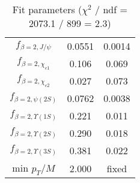 \begin{table}[h!]
\begin{tabular}{c|c|c}
$f_{\beta=2,J/\psi}$ & 0.0551 & 0.0014 \\
$f_{\beta=2,\chi_{c1}}$ & 0.106 & 0.069 \\
$f_{\beta=2,\chi_{c2}}$ & 0.027 & 0.073 \\
$f_{\beta=2,\psi(2S)}$ & 0.0762 & 0.0038 \\
$f_{\beta=2,\Upsilon(1S)}$ & 0.221 & 0.011 \\
$f_{\beta=2,\Upsilon(2S)}$ & 0.290 & 0.018 \\
$f_{\beta=2,\Upsilon(3S)}$ & 0.381 & 0.022 \\
min $p_T/M$ & 2.000 & fixed \\
\end{tabular}
\caption{Fit parameters ($\chi^2$ / ndf = 2073.1 / 899 = 2.3)}
\end{table}
